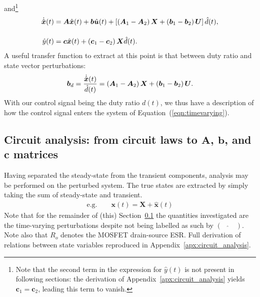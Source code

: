 and\footnote{Note that the second term in the expression for $\hat{y}(t)$ is not present in following sections: the derivation of Appendix~\ref{apx:circuit_analysis} yields $\boldsymbol{c}_1 = \boldsymbol{c}_2$, leading this term to vanish.}
\begin{align}
\dot{\hat{\boldsymbol{x}}}(t)
&= \boldsymbol{A} \hat{\boldsymbol{x}}(t) + \boldsymbol{b} \hat{\boldsymbol{u}}(t)
+ \left[\left(\boldsymbol{A}_1 - \boldsymbol{A}_2\right)\boldsymbol{X} + \left(\boldsymbol{b}_1 - \boldsymbol{b}_2\right)\boldsymbol{U}\right] \hat{d}(t),\nonumber
\\[11pt]
\hat{y}(t) &= \boldsymbol{c} \hat{\boldsymbol{x}}(t) + \left(\boldsymbol{c}_1 - \boldsymbol{c}_2\right) \boldsymbol{X} \hat{d}(t).\label{eqn:timevarying}
\end{align}
A useful transfer function to extract at this point is that between duty ratio and state vector perturbations:
\begin{align}
\boldsymbol{b}_d = \frac{\dot{\hat{\boldsymbol{x}}}(t)}{\hat{d}(t)} = \left(\boldsymbol{A}_1 - \boldsymbol{A}_2\right)\boldsymbol{X} + \left(\boldsymbol{b}_1 - \boldsymbol{b}_2\right)\boldsymbol{U}.
\label{eqn:bD}
\end{align}
With our control signal being the duty ratio $d(t)$, we thus have a description of how the control signal enters the system of Equation~(\ref{eqn:timevarying}).
\subsection{Circuit analysis: from circuit laws to $\boldsymbol{A}$, $\boldsymbol{b}$, and $\boldsymbol{c}$ matrices}\label{sec:circuitanalysis}
Having separated the steady-state from the transient components, analysis may be performed on the perturbed system. The true states are extracted by simply taking the sum of steady-state and transient.
\begin{align*}
\text{e.g.} \qquad \boldsymbol{x}(t) = \boldsymbol{X} + \hat{\boldsymbol{x}}(t)
\end{align*}
Note that for the remainder of (this) Section~\ref{sec:circuitanalysis} the quantities investigated are the time-varying perturbations despite not being labelled as such by $(\quad\hat{}\quad)$.
\newpar
Note also that $R_o$ denotes the MOSFET drain-source ESR.
\newpar
Full derivation of relations between state variables reproduced in Appendix~\ref{apx:circuit_analysis}.
